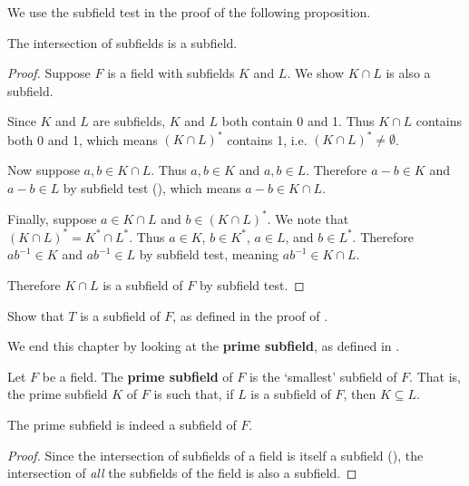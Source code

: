 We use the subfield test in the proof of the following proposition.
\begin{proposition}\label{prop-intersection-of-subfields-is-subfield}
    The intersection of subfields is a subfield.
\end{proposition}
\begin{proof}
    Suppose $F$ is a field with subfields $K$ and $L$. We show $K \cap L$ is also a subfield.

    Since $K$ and $L$ are subfields, $K$ and $L$ both contain 0 and 1. Thus $K \cap L$ contains both 0 and 1, which means $(K \cap L)^\ast$ contains 1, i.e. $(K\cap L)^\ast \neq \emptyset$.

    Now suppose $a, b \in K \cap L$. Thus $a, b \in K$ and $a, b \in L$. Therefore $a - b \in K$ and $a - b \in L$ by subfield test (), which means $a - b \in K \cap L$.

    Finally, suppose $a \in K \cap L$ and $b \in (K \cap L)^\ast$. We note that $(K \cap L)^\ast = K^\ast \cap L^\ast$. Thus $a \in K$, $b \in K^\ast$, $a \in L$, and $b \in L^\ast$. Therefore $ab^{-1} \in K$ and $ab^{-1} \in L$ by subfield test, meaning $ab^{-1} \in K \cap L$.

    Therefore $K \cap L$ is a subfield of $F$ by subfield test.
\end{proof}

\begin{exercise}\label{exercise-infinite-field-contains-Q-subset-is-subfield}
    Show that $T$ is a subfield of $F$, as defined in the proof of .
\end{exercise}

We end this chapter by looking at the \textbf{prime subfield}, as defined in \cite[p.~268]{gallian_2016}.

\begin{definition}\label{definition-prime-subfield}
    Let $F$ be a field. The \textbf{prime subfield} of $F$ is the `smallest' subfield of $F$. That is, the prime subfield $K$ of $F$ is such that, if $L$ is a subfield of $F$, then $K \subseteq L$.
\end{definition}
\begin{proposition}
    The prime subfield is indeed a subfield of $F$.
\end{proposition}
\begin{proof}
    Since the intersection of subfields of a field is itself a subfield (), the intersection of \textit{all} the subfields of the field is also a subfield.
\end{proof}

